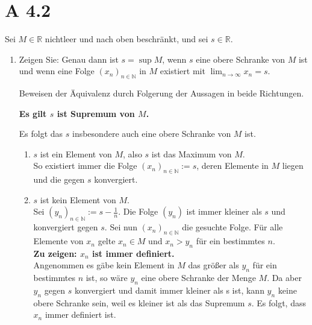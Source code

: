 \documentclass{article}
\begin{document}
    \section*{A 4.2}
    Sei \(M \in \mathbb{R}\) nichtleer und nach oben beschränkt, und sei \(s \in \mathbb{R}\).
    \begin{enumerate}[ label= (\alph*) ]
        \item Zeigen Sie: Genau dann ist \(s = \sup M\), wenn \(s\) eine obere Schranke von \(M\) ist
        und wenn eine Folge \({(x_n)}_{n \in \mathbb{N}}\) in \(M\) existiert mit \( \lim_{n \to \infty} x_n = s\).

        Beweisen der Äquivalenz durch Folgerung der Aussagen in beide Richtungen.
        \begin{center}
            \textbf{Es gilt \(s\) ist Supremum von \(M\).}
        \end{center}
        Es folgt das \(s\) insbesondere auch eine obere Schranke von \(M\) ist.
        \begin{enumerate}[ label = \arabic*. Fall ]
            \item \(s\) ist ein Element von \(M\), also \(s\) ist das Maximum von \(M\). \\
            So existiert immer die Folge \( {(x_n)}_{n \in \mathbb{N}} := s \), deren Elemente in \(M\) liegen und die gegen \(s\) konvergiert.

            \item \(s\) ist kein Element von \(M\). \\
            Sei \( {(y_n)}_{n \in \mathbb{N}} := s - \frac{1}{n} \). Die Folge \( (y_n) \) ist immer kleiner als \(s\) und konvergiert gegen \(s\).
            Sei nun \( {(x_n)}_{n \in \mathbb{N}} \) die gesuchte Folge. Für alle Elemente von \(x_n\) gelte \(x_n \in M \) und \(x_n > y_n\) für ein bestimmtes \(n\). \\
            \textbf{Zu zeigen: \(x_n\) ist immer definiert.} \\
            Angenommen es gäbe kein Element in \(M\) das größer als \(y_n\) für ein bestimmtes \(n\) ist, so wäre \(y_n\) eine obere Schranke der Menge \(M\).
            Da aber \(y_n\) gegen \(s\) konvergiert und damit immer kleiner als s ist, kann \(y_n\) keine obere Schranke sein, weil es kleiner ist als das Supremum \(s\).
            Es folgt, dass \(x_n\) immer definiert ist. \\
            

\end{enumerate}
\end{enumerate}
\end{document}
